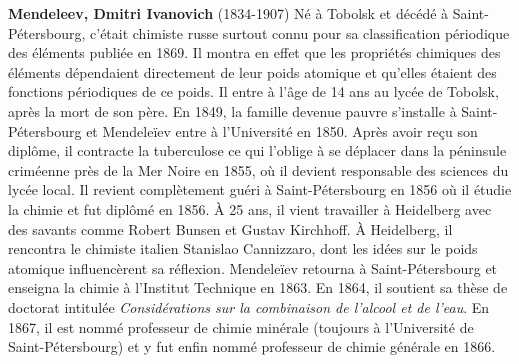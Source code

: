 \textbf{Mendeleev, Dmitri Ivanovich} (1834-1907) Né à Tobolsk et décédé à Saint-Pétersbourg, c'était chimiste russe surtout connu pour sa classification périodique des éléments publiée en 1869. Il montra en effet que les propriétés chimiques des éléments dépendaient directement de leur poids atomique et qu'elles étaient des fonctions périodiques de ce poids. Il entre à l'âge de 14 ans au lycée de Tobolsk, après la mort de son père. En 1849, la famille devenue pauvre s'installe à Saint-Pétersbourg et Mendeleïev entre à l'Université en 1850. Après avoir reçu son diplôme, il contracte la tuberculose ce qui l'oblige à se déplacer dans la péninsule criméenne près de la Mer Noire en 1855, où il devient responsable des sciences du lycée local. Il revient complètement guéri à Saint-Pétersbourg en 1856 où il étudie la chimie et fut diplômé en 1856. À 25 ans, il vient travailler à Heidelberg avec des savants comme Robert Bunsen et Gustav Kirchhoff. À Heidelberg, il rencontra le chimiste italien Stanislao Cannizzaro, dont les idées sur le poids atomique influencèrent sa réflexion. Mendeleïev retourna à Saint-Pétersbourg et enseigna la chimie à l'Institut Technique en 1863. En 1864, il soutient sa thèse de doctorat intitulée \textit{Considérations sur la combinaison de l'alcool et de l'eau}. En 1867, il est nommé professeur de chimie minérale (toujours à l'Université de Saint-Pétersbourg) et y fut enfin nommé professeur de chimie générale en 1866.


